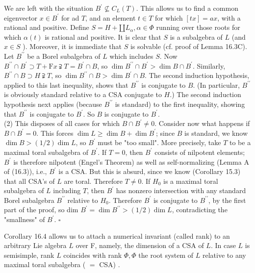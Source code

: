 \documentclass[10pt]{article}
\begin{document}
We are left with the situation $B^{\prime} \nsubseteq C_{L}(T)$. This allows us to find a common eigenvector $x \in B^{\prime}$ for ad $T$, and an element $t \in T$ for which $[t x]=a x$, with a rational and positive. Define $S=H+\amalg L_{\alpha}, \alpha \in \Phi$ running over those roots for which $\alpha(t)$ is rational and positive. It is clear that $S$ is a subalgebra of $L$ (and $x \in S$ ). Moreover, it is immediate that $S$ is solvable (cf. proof of Lemma 16.3C). Let $B^{\prime \prime}$ be a Borel subalgebra of $L$ which includes $S$. Now $B^{\prime \prime} \cap B^{\prime} \supset T+\mathrm{F} x \supsetneqq T=B^{\prime} \cap B$, so $\operatorname{dim} B^{\prime \prime} \cap B^{\prime}>\operatorname{dim} B \cap B^{\prime}$. Similarly, $B^{\prime \prime} \cap B \supset H \supsetneqq T$, so $\operatorname{dim} B^{\prime \prime} \cap B>\operatorname{dim} B^{\prime} \cap B$. The second induction hypothesis, applied to this last inequality, shows that $B^{\prime \prime}$ is conjugate to $B$. (In particular, $B^{\prime \prime}$ is obviously standard relative to a CSA conjugate to $H$.) The second induction hypothesis next applies (because $B^{\prime \prime}$ is standard) to the first inequality, showing that $B^{\prime \prime}$ is conjugate to $B^{\prime}$. So $B$ is conjugate to $B^{\prime}$.\\
(2) This disposes of all cases for which $B \cap B^{\prime} \neq 0$. Consider now what happens if $B \cap B^{\prime}=0$. This forces $\operatorname{dim} L \geq \operatorname{dim} B+\operatorname{dim} B^{\prime}$; since $B$ is standard, we know $\operatorname{dim} B>(1 / 2) \operatorname{dim} L$, so $B^{\prime}$ must be "too small". More precisely, take $T$ to be a maximal toral subalgebra of $B^{\prime}$. If $T=0$, then $B^{\prime}$ consists of nilpotent elements; $B^{\prime}$ is therefore nilpotent (Engel's Theorem) as well as self-normalizing (Lemma A of (16.3)), i.e., $B^{\prime}$ is a CSA. But this is absurd, since we know (Corollary 15.3) that all CSA's of $L$ are toral. Therefore $T \neq 0$. If $H_{0}$ is a maximal toral subalgebra of $L$ including $T$, then $B^{\prime}$ has nonzero intersection with any standard Borel subalgebra $B^{\prime \prime}$ relative to $H_{0}$. Therefore $B^{\prime}$ is conjugate to $B^{\prime \prime}$, by the first part of the proof, so dim $B^{\prime}=\operatorname{dim} B^{\prime \prime}>(1 / 2) \operatorname{dim} L$, contradicting the "smallness" of $B^{\prime}$. $\square$

Corollary 16.4 allows us to attach a numerical invariant (called rank) to an arbitrary Lie algebra $L$ over F, namely, the dimension of a CSA of $L$. In case $L$ is semisimple, rank $L$ coincides with rank $\Phi, \Phi$ the root system of $L$ relative to any maximal toral subalgebra ( $=$ CSA) .
\end{document}
